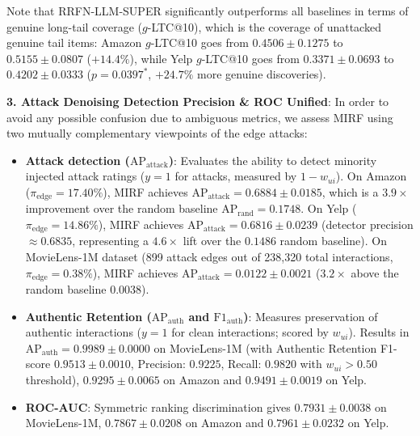 \documentclass[10pt,journal]{IEEEtran}
\begin{document}
Note that RRFN-LLM-SUPER significantly outperforms all baselines in terms of genuine long-tail coverage ($g$-LTC@10), which is the coverage of unattacked genuine tail items: Amazon $g$-LTC@10 goes from $0.4506 \pm 0.1275$ to $\mathbf{0.5155 \pm 0.0807}$ ($+14.4\%$), while Yelp $g$-LTC@10 goes from $0.3371 \pm 0.0693$ to $\mathbf{0.4202 \pm 0.0333}$ ($p = 0.0397^*$, $+24.7\%$ more genuine discoveries).

\textbf{3. Attack Denoising Detection Precision \& ROC Unified}: In order to avoid any possible confusion due to ambiguous metrics, we assess MIRF using two mutually complementary viewpoints of the edge attacks:
\begin{itemize}
    \item \textbf{Attack detection ($\text{AP}_{\text{attack}}$)}: Evaluates the ability to detect minority injected attack ratings ($y = 1$ for attacks, measured by $1 - w_{ui}$). On Amazon ($\pi_{\text{edge}} = 17.40\%$), MIRF achieves $\text{AP}_{\text{attack}} = \mathbf{0.6884 \pm 0.0185}$, which is a $3.9\times$ improvement over the random baseline $\text{AP}_{\text{rand}} = 0.1748$. On Yelp ($\pi_{\text{edge}} = 14.86\%$), MIRF achieves $\text{AP}_{\text{attack}} = \mathbf{0.6816 \pm 0.0239}$ (detector precision $\approx 0.6835$, representing a $4.6\times$ lift over the $0.1486$ random baseline). On MovieLens-1M dataset (899 attack edges out of 238,320 total interactions, $\pi_{\text{edge}} = 0.38\%$), MIRF achieves $\text{AP}_{\text{attack}} = \mathbf{0.0122 \pm 0.0021}$ ($3.2\times$ above the random baseline $0.0038$).
    \item \textbf{Authentic Retention ($\text{AP}_{\text{auth}}$ and $\text{F1}_{\text{auth}}$)}: Measures preservation of authentic interactions ($y = 1$ for clean interactions; scored by $w_{ui}$). Results in $\text{AP}_{\text{auth}} = \mathbf{0.9989 \pm 0.0000}$ on MovieLens-1M (with Authentic Retention F1-score $\mathbf{0.9513 \pm 0.0010}$, Precision: $0.9225$, Recall: $0.9820$ with $w_{ui} > 0.50$ threshold), $\mathbf{0.9295 \pm 0.0065}$ on Amazon and $\mathbf{0.9491 \pm 0.0019}$ on Yelp.
    \item \textbf{ROC-AUC}: Symmetric ranking discrimination gives $\mathbf{0.7931 \pm 0.0038}$ on MovieLens-1M, $\mathbf{0.7867 \pm 0.0208}$ on Amazon and $\mathbf{0.7961 \pm 0.0232}$ on Yelp.
\end{itemize}
\end{document}
